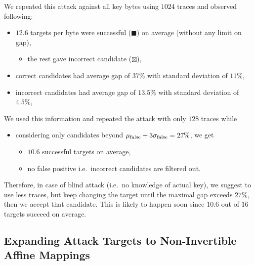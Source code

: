 We repeated this attack against all key bytes using $1024$ traces and observed following:
\begin{itemize}
	\item $12.6$ targets per byte were successful ($\blacksquare$) on average (without any limit on gap),
	\begin{itemize}
		\item the rest gave incorrect candidate ($\boxtimes$),
	\end{itemize}
	\item correct candidates had average gap of $37\%$ with standard deviation of $11\%$,
	\item incorrect candidates had average gap of $13.5\%$ with standard deviation of $4.5\%$,
\end{itemize}
We used this information and repeated the attack with only $128$ traces while
\begin{itemize}
	\item considering only candidates beyond $\mu_\textnormal{false}+3\sigma_\textnormal{false} = 27\%$, we get
	\begin{itemize}
		\item $10.6$ successful targets on average,
		\item no false positive i.e.\ incorrect candidates are filtered out.
	\end{itemize}
\end{itemize}
Therefore, in case of blind attack (i.e.\ no knowledge of actual key), we suggest to use less traces, but keep changing the target until the maximal gap exceeds $27\%$, then we accept that candidate. This is likely to happen soon since $10.6$ out of $16$ targets succeed on average.

\subsection{Expanding Attack Targets to Non-Invertible Affine Mappings}




